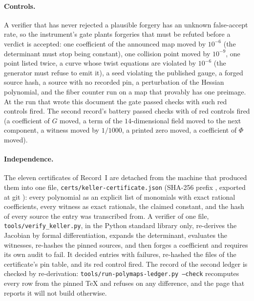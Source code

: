 \documentclass[11pt]{article}
\begin{document}
\paragraph{Controls.} A verifier that has never rejected a plausible forgery has an unknown
false-accept rate, so the instrument's gate plants forgeries that must be refuted before a verdict
is accepted: one coefficient of the announced map moved by $10^{-6}$ (the determinant must stop
being constant), one collision point moved by $10^{-9}$, one point listed twice, a curve whose
twist equations are violated by $10^{-6}$ (the generator must refuse to emit it), a seed
violating the published gauge, a forged source hash, a source with no recorded pin, a
perturbation of the Hessian polynomial, and the fiber counter run on a map that provably has one
preimage. At the run that wrote this document the gate passed \BatPass{} checks with
\BatReds{} such red controls fired. The second record's battery passed \PolyBatPass{} checks
with \PolyBatReds{} of \PolyBatReds{} red controls fired (a coefficient of $G$ moved, a term
of the $14$-dimensional field moved to the next component, a witness moved by $1/1000$, a printed
zero moved, a coefficient of $\Phi$ moved).

\paragraph{Independence.} The eleven certificates of Record~I are detached from the machine that
produced them into one file, \texttt{certs/keller-certificate.json} (SHA-256 prefix
\texttt{\CertSha}, exported at git \texttt{\CertGit}): every polynomial as an explicit list of
monomials with exact rational coefficients, every witness as exact rationals, the claimed constant,
and the hash of every source the entry was transcribed from. A verifier of one file,
\texttt{tools/verify\_keller.py}, in the Python standard library only, re-derives the Jacobian by
formal differentiation, expands the determinant, evaluates the witnesses, re-hashes the pinned
sources, and then forges a coefficient and requires its own audit to fail. It decided
\VerEntries{} entries with \VerFails{} failures, re-hashed the \VerPins{} files of the
certificate's pin table, and its red control fired. The record of the second ledger is checked by
re-derivation: \texttt{tools/run-polymaps-ledger.py --check} recomputes every row from the pinned
TeX and refuses on any difference, and the page that reports it will not build otherwise.
\end{document}
